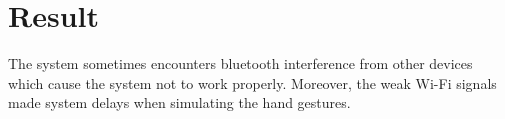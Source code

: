 \section{Result}
The system sometimes encounters bluetooth interference from other devices which
cause the system not to work properly. Moreover, the weak Wi-Fi signals made system delays when simulating the hand gestures. 
